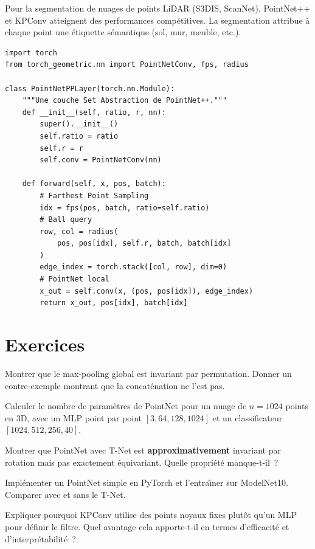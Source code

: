 \begin{exemple}
Pour la segmentation de nuages de points LiDAR (S3DIS, ScanNet),
PointNet++ et KPConv atteignent des performances comp\'etitives.
La segmentation attribue \`a chaque point une \'etiquette s\'emantique
(sol, mur, meuble, etc.).
\end{exemple}

\begin{verbatim}
import torch
from torch_geometric.nn import PointNetConv, fps, radius

class PointNetPPLayer(torch.nn.Module):
    """Une couche Set Abstraction de PointNet++."""
    def __init__(self, ratio, r, nn):
        super().__init__()
        self.ratio = ratio
        self.r = r
        self.conv = PointNetConv(nn)

    def forward(self, x, pos, batch):
        # Farthest Point Sampling
        idx = fps(pos, batch, ratio=self.ratio)
        # Ball query
        row, col = radius(
            pos, pos[idx], self.r, batch, batch[idx]
        )
        edge_index = torch.stack([col, row], dim=0)
        # PointNet local
        x_out = self.conv(x, (pos, pos[idx]), edge_index)
        return x_out, pos[idx], batch[idx]
\end{verbatim}

\section{Exercices}

\begin{exercice}
Montrer que le max-pooling global est invariant par permutation.
Donner un contre-exemple montrant que la concat\'enation ne l'est pas.
\end{exercice}

\begin{exercice}
Calculer le nombre de param\`etres de PointNet pour un nuage de
$n = 1024$ points en 3D, avec un MLP point par point
$[3, 64, 128, 1024]$ et un classificateur $[1024, 512, 256, 40]$.
\end{exercice}

\begin{exercice}[\'Equivariance]
Montrer que PointNet avec T-Net est \textbf{approximativement}
invariant par rotation mais pas exactement \'equivariant.
Quelle propri\'et\'e manque-t-il~?
\end{exercice}

\begin{exercice}
Impl\'ementer un PointNet simple en PyTorch et l'entra\^\i ner
sur ModelNet10. Comparer avec et sans le T-Net.
\end{exercice}

\begin{exercice}
Expliquer pourquoi KPConv utilise des points noyaux fixes plut\^ot
qu'un MLP pour d\'efinir le filtre. Quel avantage cela apporte-t-il
en termes d'efficacit\'e et d'interpr\'etabilit\'e~?
\end{exercice}
